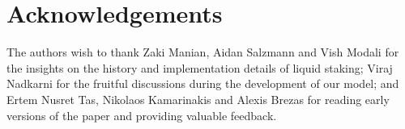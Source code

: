 \section{Acknowledgements}

The authors wish to thank Zaki Manian, Aidan Salzmann and Vish Modali
for the insights on the history and implementation details of liquid staking;
Viraj Nadkarni for the fruitful discussions during the
development of our model; and Ertem Nusret Tas, Nikolaos Kamarinakis and
Alexis Brezas for reading early versions of the paper
and providing valuable feedback.